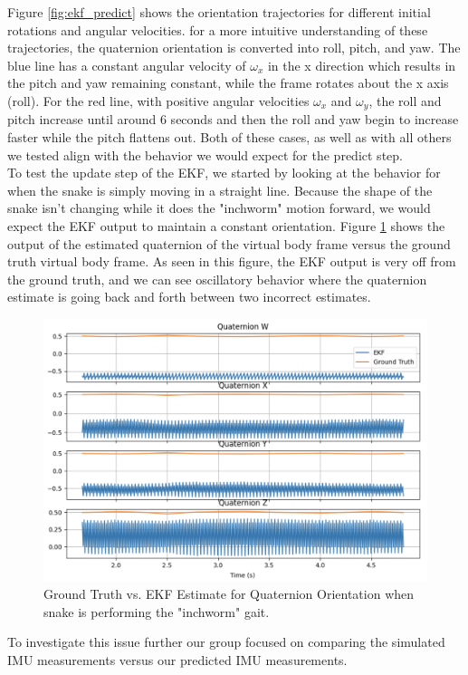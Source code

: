 \documentclass[letterpaper, 10 pt, conference]{ieeeconf}  %
\begin{document}
Figure \ref{fig:ekf_predict} shows the orientation trajectories for different initial rotations and angular velocities. for a more intuitive understanding of these trajectories, the quaternion orientation is converted into roll, pitch, and yaw. The blue line has a constant angular velocity of $\omega_x$ in the x direction which results in the pitch and yaw remaining constant, while the frame rotates about the x axis (roll). For the red line, with positive angular velocities $\omega_x$ and $\omega_y$, the roll and pitch increase until around 6 seconds and then the roll and yaw begin to increase faster while the pitch flattens out. Both of these cases, as well as with all others we tested align with the behavior we would expect for the predict step.\\

To test the update step of the EKF, we started by looking at the behavior for when the snake is simply moving in a straight line. Because the shape of the snake isn't changing while it does the "inchworm" motion forward, we would expect the EKF output to maintain a constant orientation. Figure \ref{fig:ekf_quaternion_sad} shows the output of the estimated quaternion of the virtual body frame versus the ground truth virtual body frame. As seen in this figure, the EKF output is very off from the ground truth, and we can see oscillatory behavior where the quaternion estimate is going back and forth between two incorrect estimates.

\begin{figure}[H]
    \centering
    \includegraphics[width = 0.75\linewidth]{ekf_update_sad.png}
    \caption{Ground Truth vs. EKF Estimate for Quaternion Orientation when snake is performing the "inchworm" gait.}
    \label{fig:ekf_quaternion_sad}
\end{figure}

To investigate this issue further our group focused on comparing the simulated IMU measurements versus our predicted IMU measurements. 
\end{document}

